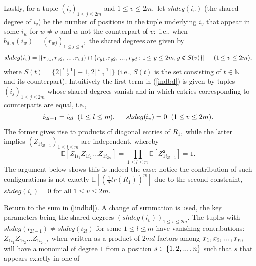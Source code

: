 \documentclass{article}
\numberwithin{equation}{section}
\begin{document}
Lastly, for a tuple \((i_j)_{1 \leq j \leq 2m}\) and \(1 \leq v \leq 2m,\) let \(shdeg(i_v)\) (the shared degree of \(i_v\)) be the number of positions in the tuple underlying \(i_v\) that appear in some \(i_w\) for \(w \ne v\) and \(w\) not the counterpart of \(v:\) i.e., when \(b_{d,n}(i_w)=(r_{wj})_{1 \leq j \leq d},\) the shared degrees are given by
\[shdeg(i_v)=|\{r_{v1},r_{v2},\hspace{0.05cm}...\hspace{
0.05cm},r_{vd}\} \cap \{r_{y1},r_{y2},\hspace{0.05cm}...\hspace{
0.05cm},r_{yd}: 1 \leq y \leq 2m, y \not \in S(v)\}| \hspace{0.5cm} (1 \leq v \leq 2m),\]
where \(S(t)=\{2 \lceil \frac{t+1}{2} \rceil-1, 2 \lceil \frac{t+1}{2} \rceil\}\) (i.e., \(S(t)\) is the set consisting of \(t \in \mathbb{N}\) and its counterpart). Intuitively the first term in (\ref{indbd}) is given by tuples \((i_j)_{1 \leq j \leq 2m}\) whose shared degrees vanish and in which entries corresponding to counterparts are equal, i.e., 
\[i_{2l-1}=i_{2l} \hspace{0.2cm} (1 \leq l \leq m), \hspace{0.5cm} shdeg(i_v)=0 \hspace{0.2cm} (1 \leq v \leq 2m).\]
The former gives rise to products of diagonal entries of \(R_1,\) while the latter implies \((Z_{1i_{2l-1}})_{1 \leq l \leq m}\) are independent, whereby 
\[\mathbb{E}[Z_{1i_1}Z_{1i_2}...Z_{1i_{2m}}]=\prod_{1 \leq l \leq m}{\mathbb{E}[Z^2_{1i_{2l-1}}]}=1.\] 
The argument below shows this is indeed the case: notice the contribution of such configurations is not exactly \(\mathbb{E}[(\frac{1}{N}tr(R_1))^m]\) due to the second constraint, \(shdeg(i_v)=0\) for all \(1 \leq v \leq 2m.\) %
\vspace{0.3cm}
\par 
Return to the sum in (\ref{indbd}). A change of summation is used, the key parameters being the shared degrees \((shdeg(i_v))_{1 \leq v \leq 2m}.\) The tuples with \(shdeg(i_{2l-1}) \ne shdeg(i_{2l})\) for some \(1 \leq l \leq m\) have vanishing contributions: \(Z_{1i_1}Z_{1i_2}...Z_{1i_{2m}},\) when written as a product of \(2md\) factors among \(x_1,x_2,\hspace{0.05cm}...\hspace{0.05cm},x_n,\) will have a monomial of degree \(1\) from a position \(s \in \{1,2,\hspace{0.05cm}...\hspace{0.05cm},n\}\) such that \(s\) that appears exactly in one of
\end{document}
